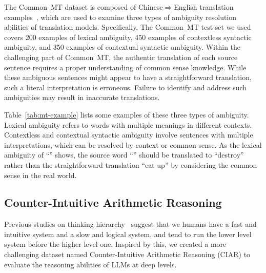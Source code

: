 The Common~MT dataset is composed of Chinese$\Rightarrow$English translation examples~\citep{he-etal-2020-box}, which are used to examine three types of ambiguity resolution abilities of translation models. Specifically, The Common~MT test set we used covers 200 examples of lexical ambiguity, 450 examples of contextless syntactic ambiguity, and 350 examples of contextual syntactic ambiguity. Within the challenging part of Common~MT, the authentic translation of each source sentence requires a proper understanding of common sense knowledge. While these ambiguous sentences might appear to have a straightforward translation, such a literal interpretation is erroneous. Failure to identify and address such ambiguities may result in inaccurate translations.

Table~\ref{tab:mt-example} lists some examples of these three types of ambiguity. Lexical ambiguity refers to words with multiple meanings in different contexts. Contextless and contextual syntactic ambiguity involve sentences with multiple interpretations, which can be resolved by context or common sense. As the lexical ambiguity of ``'' shows, the source word ``'' should be translated to ``destroy'' rather than the straightforward translation ``eat up'' by considering the common sense in the real world.


\subsection{Counter-Intuitive Arithmetic Reasoning}
Previous studies on thinking hierarchy~\citep{kahneman2011thinking} suggest that we humans have a fast and intuitive system and a slow and logical system, and tend to run the lower level system before the higher level one. Inspired by this, we created a more challenging dataset named Counter-Intuitive Arithmetic Reasoning (CIAR) to evaluate the reasoning abilities of LLMs at deep levels. 

